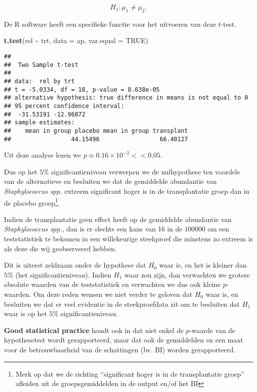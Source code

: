 \documentclass[
  12pt,dutch,coursenotes]{book}
\newenvironment{Shaded}{\begin{snugshade}}{\end{snugshade}}
\newcommand{\DataTypeTok}[1]{\textcolor[rgb]{0.13,0.29,0.53}{#1}}
\newcommand{\KeywordTok}[1]{\textcolor[rgb]{0.13,0.29,0.53}{\textbf{#1}}}
\newcommand{\NormalTok}[1]{#1}
\newcommand{\OperatorTok}[1]{\textcolor[rgb]{0.81,0.36,0.00}{\textbf{#1}}}
\newcommand{\OtherTok}[1]{\textcolor[rgb]{0.56,0.35,0.01}{#1}}
\newcommand{\StringTok}[1]{\textcolor[rgb]{0.31,0.60,0.02}{#1}}
\theoremstyle{definition}
\theoremstyle{definition}
\theoremstyle{definition}
\theoremstyle{remark}
\begin{document}
\[H_1: \mu_1\neq \mu_2.\]

De R software heeft een specifieke functie voor het uitvoeren van deze \(t\)-test.

\begin{Shaded}
\begin{Highlighting}[]
\KeywordTok{t.test}\NormalTok{(rel }\OperatorTok{\textasciitilde{}}\StringTok{ }\NormalTok{trt, }\DataTypeTok{data =}\NormalTok{ ap, }\DataTypeTok{var.equal =} \OtherTok{TRUE}\NormalTok{)}
\end{Highlighting}
\end{Shaded}

\begin{verbatim}
## 
##  Two Sample t-test
## 
## data:  rel by trt
## t = -5.0334, df = 18, p-value = 8.638e-05
## alternative hypothesis: true difference in means is not equal to 0
## 95 percent confidence interval:
##  -31.53191 -12.96072
## sample estimates:
##    mean in group placebo mean in group transplant 
##                 44.15496                 66.40127
\end{verbatim}

Uit deze analyse lezen we \(p\approx 0.16 \times 10^{-3}<<0.05\).

Dus op het \(5\%\) significantieniveau verwerpen we de nulhypothese ten voordele van de alternatieve en besluiten we dat de gemiddelde abundantie van \emph{Staphylococcus spp.} extreem significant hoger is in de transplantatie groep dan in de placebo groep\footnote{Merk op dat we de richting ``significant hoger is in de transplantatie groep'' afleiden uit de groepsgemiddelden in de output en/of het BI}.

Indien de transplantatie geen effect heeft op de gemiddelde abundantie van \emph{Staphylococcus spp.}, dan is er slechts een kans van 16 in de \(100000\) om een teststatistiek te bekomen in een willekeurige steekproef die minstens zo extreem is als deze die wij geobserveerd hebben.

Dit is uiterst zeldzaam onder de hypothese dat \(H_0\) waar is, en het is kleiner dan \(5\%\) (het significantieniveau). Indien \(H_1\) waar zou zijn, dan verwachten we grotere absolute waarden van de teststatistiek en verwachten we dus ook kleine \(p\)-waarden. Om deze reden wensen we niet verder te geloven dat \(H_0\) waar is, en besluiten we dat er veel evidentie in de steekproefdata zit om te besluiten dat \(H_1\) waar is op het \(5\%\) significantieniveau.

\textbf{Good statistical practice} houdt ook in dat niet enkel de \(p\)-waarde van de hypothesetest wordt gerapporteerd, maar dat ook de gemiddelden en een maat voor de betrouwbaarheid van de schattingen (bv. BI) worden gerapporteerd.
\end{document}
